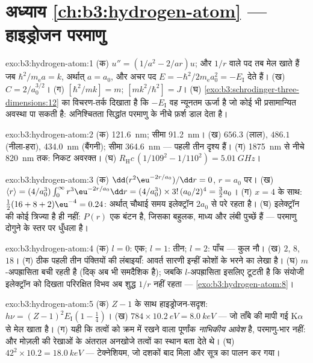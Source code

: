 \section*{अध्याय \ref{ch:b3:hydrogen-atom} --- हाइड्रोजन परमाणु}

\begin{solution}{exo:b3:hydrogen-atom:1}
(क) $u'' = (1/a^2 - 2/ar)u$; और $1/r$ वाले पद तब मेल खाते हैं जब
$\hbar^2/m_{\text{e}}a = k$, अर्थात् $a = a_0$, और अचर पद
$E = -\hbar^2/2m_{\text{e}}a_0^2 = -E_{\text{I}}$ देते हैं। (ख) $C =
2/a_0^{3/2}$। (ग) $[\hbar^2/mk] = \unit{m}$; $[mk^2/\hbar^2] =
\unit{J}$। (घ)
\cref{exo:b3:schrodinger-three-dimensions:12} का विचरण-तर्क दिखाता है
कि $-E_{\text{I}}$ वह न्यूनतम ऊर्जा है जो कोई भी प्रसामान्यित अवस्था
पा सकती है: अनिश्चितता सिद्धांत परमाणु के नीचे फ़र्श डाल देता है।
\end{solution}

\begin{solution}{exo:b3:hydrogen-atom:2}
(क) \qty{121.6}{nm}; सीमा \qty{91.2}{nm}। (ख) $656.3$ (लाल),
$486.1$ (नीला-हरा), \qty{434.0}{nm} (बैंगनी); सीमा
\qty{364.6}{nm} --- पहली तीन दृश्य हैं। (ग)
\qty{1875}{nm} से नीचे \qty{820}{nm} तक: निकट अवरक्त। (घ)
$R_{\text{H}}c\,(1/109^2 - 1/110^2) = \qty{5.01}{GHz}$।
\end{solution}

\begin{solution}{exo:b3:hydrogen-atom:3}
(क) $\dd(r^2\eu^{-2r/a_0})/\dd r = 0$, $r = a_0$ पर। (ख) $\langle r\rangle = (4/a_0^3)\int_0^\infty
r^3\eu^{-2r/a_0}\dd r = (4/a_0^3)\times 3!\,(a_0/2)^4 = \tfrac32
a_0$। (ग) $x = 4$ के साथ:
$\tfrac12(16 + 8 + 2)\eu^{-4} = 0.24$: अर्थात् चौथाई समय
इलेक्ट्रॉन $2a_0$ से परे रहता है। (घ) इलेक्ट्रॉन की कोई त्रिज्या है ही
नहीं: $P(r)$ एक बंटन है, जिसका बहुलक, माध्य और लंबी पुच्छें हैं ---
परमाणु दोगुने के स्तर पर धुँधला है।
\end{solution}

\begin{solution}{exo:b3:hydrogen-atom:4}
(क) $l = 0$: एक; $l = 1$: तीन; $l = 2$: पाँच --- कुल नौ। (ख) $2$,
$8$, $18$। (ग) ठीक पहली तीन पंक्तियों की लंबाइयाँ: आवर्त
सारणी इन्हीं कोशों के भरने का लेखा है। (घ)
$m$-अपह्रासिता बची रहती है (दिक् अब भी समदैशिक है); जबकि
$l$-अपह्रासिता इसलिए टूटती है कि संयोजी इलेक्ट्रॉन को दिखता परिरक्षित
विभव अब शुद्ध $1/r$ नहीं रहता ---
\cref{exo:b3:hydrogen-atom:8}।
\end{solution}

\begin{solution}{exo:b3:hydrogen-atom:5}
(क) $Z - 1$ के साथ हाइड्रोजन-सदृश: $h\nu = (Z-1)^2E_{\text{I}}(1 -
\tfrac14)$। (ख) $784 \times \qty{10.2}{eV} = \qty{8.0}{keV}$ ---
जो ताँबे की मापी गई K$\alpha$ से मेल खाता है। (ग) यही कि तत्वों को
क्रम में रखने वाला पूर्णांक \emph{नाभिकीय आवेश} है, परमाणु-भार नहीं:
और मोज़ली की रेखाओं के अंतराल अनखोजे तत्वों का स्थान बता देते थे। (घ)
$42^2 \times 10.2 = \qty{18.0}{keV}$ --- टेक्नेशियम, जो दशकों
बाद मिला और सूत्र का पालन कर गया।
\end{solution}

